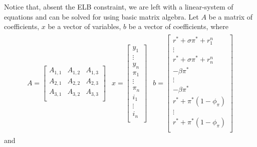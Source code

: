 \documentclass[11pt]{article}
\begin{document}
\begin{singlespace}
		Notice that, absent the ELB constraint, we are left with a linear-system of equations and can be solved for using basic matrix algebra. Let $A$ be a matrix of coefficients, $x$ be a vector of variables, $b$ be a vector of coefficients, where 
		\begin{align*}
		\begin{array}{ccc}
		A = 
		\begin{bmatrix}
			A_{1,1} & A_{1,2} & A_{1,3} \\
			A_{2,1} & A_{2,2} & A_{2,3} \\
			A_{3,1} & A_{3,2} & A_{3,3} \\
			\end{bmatrix} & 
			x =
			\begin{bmatrix}
			y_1\\
			\vdots\\
			y_n\\
			\pi_1\\
			\vdots\\
			\pi_n\\
			i_1\\
			\vdots\\
			i_n\\
			\end{bmatrix}& 
			b =
			\begin{bmatrix}
			r^* + \sigma\pi^* + r^n_1\\
			\vdots\\
			r^* + \sigma\pi^* + r^n_n\\
			-\beta\pi^*\\
			\vdots\\
			-\beta\pi^*\\
			r^* + \pi^*(1-\phi_{\pi})\\
			\vdots\\
			r^* + \pi^*(1-\phi_{\pi})\\			
			\end{bmatrix}
		\end{array}
		\end{align*}
		and
		

\end{singlespace}
\end{document}

